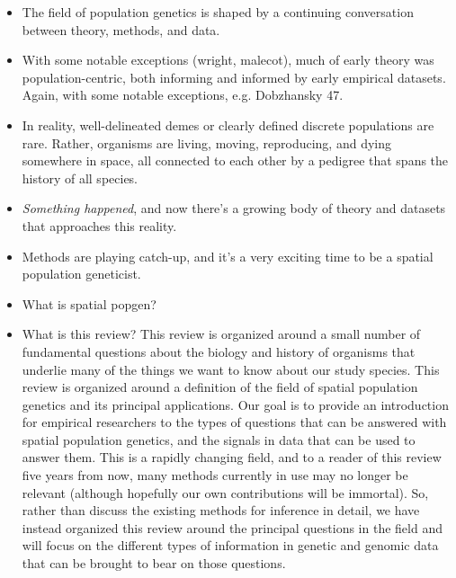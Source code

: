 \documentclass{ar-1col}
\begin{document}
\begin{itemize}
\item The field of population genetics is shaped by a continuing conversation 
between theory, methods, and data.
\item With some notable exceptions (wright, malecot), 
much of early theory was population-centric, 
both informing and informed by early empirical datasets.
	\subitem Again, with some notable exceptions, e.g. Dobzhansky 47.
\item In reality, well-delineated demes or clearly defined discrete populations are rare.
Rather, organisms are living, moving, reproducing, and dying somewhere in space, 
all connected to each other by a pedigree that spans the history of all species.
\item \emph{Something happened}, 
and now there's a growing body of theory and datasets 
that approaches this reality.
\item Methods are playing catch-up, 
and it's a very exciting time to be a spatial population geneticist.
\item What is spatial popgen?
\item What is this review?
\subitem This review is organized around a small number of 
fundamental questions about the biology and history of organisms 
that underlie many of the things we want to know about our study species.
This review is organized around a definition of the field of spatial population genetics 
and its principal applications.
Our goal is to provide an introduction for empirical researchers 
to the types of questions that can be answered 
with spatial population genetics, 
and the signals in data that can be used to answer them.
This is a rapidly changing field, 
and to a reader of this review five years from now, 
many methods currently in use may no longer be relevant 
(although hopefully our own contributions will be immortal).
So, rather than discuss the existing methods for inference in detail, 
we have instead organized this review around the principal questions in the field 
and will focus on the different types of information in genetic and genomic data 
that can be brought to bear on those questions.
\end{itemize}
\end{document}
